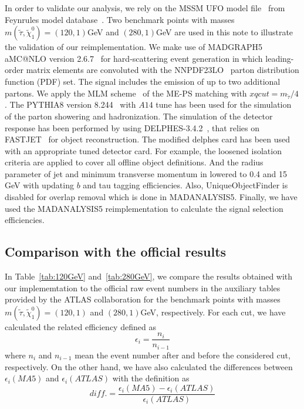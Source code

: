 \documentclass{ws-mpla}
\begin{document}
In order to validate our analysis, we rely on the MSSM UFO model file~\cite{Duhr:2011se} from Feynrules model database~\cite{Alloul:2013bka}. 
Two benchmark points with masses $ m(\tilde{\tau},\tilde{\chi}^0_1)=(120,1) $GeV and $ (280,1) $GeV are used in this note to illustrate the validation of our reimplementation. 
We make use of MADGRAPH5 aMC@NLO version 2.6.7~\cite{Alwall:2014hca} for hard-scattering event generation in which leading-order matrix elements are convoluted with the NNPDF23LO~\cite{Martin:2009iq} parton distribution function (PDF) set. The signal includes the emission of up to two additional partons. We apply the MLM scheme~\cite{Mangano:2006rw,Alwall:2008qv} of the ME-PS matching with $xqcut = m_{\tilde{\tau}}/4$. 
The PYTHIA8 version 8.244~\cite{Sjostrand:2007gs} with $A14$ tune has been used for the simulation of the parton showering and hadronization. The simulation of the detector response has been performed by using DELPHES-3.4.2~\cite{deFavereau:2013fsa}, that relies on FASTJET~\cite{Cacciari:2011ma} for object reconstruction.
The modified delphes card has been used with an appropriate tuned detector card.
For example, the loosened isolation criteria are applied to cover all offline object definitions.
And the radius parameter of jet and minimum transverse momentum in lowered to 0.4 and 15 GeV with updating $b$ and tau tagging efficiencies.
Also, UniqueObjectFinder is disabled for overlap removal which is done in MADANALYSIS5.
Finally, we have used the MADANALYSIS5 reimplementation to calculate the signal selection efficiencies.



\subsection{Comparison with the official results}
In Table~\ref{tab:120GeV} and~\ref{tab:280GeV}, we compare the results obtained with our implememtation to the official raw event numbers in the auxiliary tables provided by the ATLAS collaboration for the benchmark points with masses $m(\tilde{\tau},\tilde{\chi}^0_1)=(120,1) $ and $(280,1)$GeV, respectively. 
For each cut, we have calculated the related efficiency defined as 
\begin{equation}
\epsilon_i =\frac{n_i}{n_{i-1}}
\end{equation}
where $ n_i $ and $ n_{i-1} $ mean the event number after and before the considered cut, respectively.
%
On the other hand, we have also calculated the differences between $ \epsilon_i (MA5)$ and $ \epsilon_i (ATLAS)$ with the definition as
\begin{equation}
diff. = \frac{\epsilon_i (MA5)-\epsilon_i (ATLAS)}{\epsilon_i (ATLAS)}
\end{equation}
\end{document}

